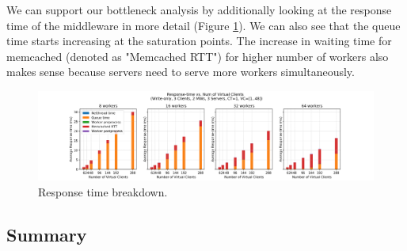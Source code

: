 We can support our bottleneck analysis by additionally looking at the response time of the middleware in more detail (Figure \ref{rt_breakdown_write_full_write}). We can also see that the queue time starts increasing at the saturation points.
The increase in waiting time for memcached (denoted as "Memcached RTT") for higher number of workers also makes sense because servers need to serve more workers simultaneously. 
\begin{figure}[H]
    \centering
	\includegraphics[scale=0.48,width=\linewidth]{figures/3_ThroughputForWrites/full_write_mw_rt_breakdown_write_2018-11-09_13h02.png}
	\caption{Response time breakdown.}
	\label{rt_breakdown_write_full_write}
\end{figure}



\subsection{Summary}

